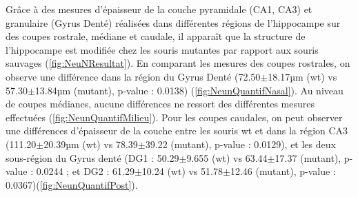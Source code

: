 		Grâce à des mesures d'épaisseur de la couche pyramidale (CA1, CA3) et granulaire (Gyrus Denté) réalisées dans différentes régions de l'hippocampe sur des coupes rostrale, médiane et caudale, il apparaît que la structure de l'hippocampe est modifiée chez les souris mutantes par rapport aux souris sauvages (\cref{fig:NeuNResultat}). En comparant les mesures des coupes rostrales, on observe une différence dans la région du Gyrus Denté (72.50$\pm$18.17µm (\acrshort{wt}) vs 57.30$\pm$13.84µm (mutant), p-value : 0.0138) (\cref{fig:NeunQuantifNasal}).  Au niveau de coupes médianes, aucune différences ne ressort des différentes mesures effectuées (\cref{fig:NeunQuantifMilieu}). Pour les coupes caudales, on peut observer une différences d'épaisseur de la couche entre les souris \gls{wt} et \mcrd dans la région CA3 (111.20$\pm$20.39µm (\acrshort{wt}) vs 78.39$\pm$39.22 (mutant), p-value : 0.0129), et les deux sous-région du Gyrus denté (DG1 : 50.29$\pm$9.655 (\acrshort{wt}) vs 63.44$\pm$17.37 (mutant), p-value : 0.0244 ; et DG2 : 61.29$\pm$10.24 (\acrshort{wt}) vs 51.78$\pm$12.46 (mutant), p-value : 0.0367)(\cref{fig:NeunQuantifPost}).
		
